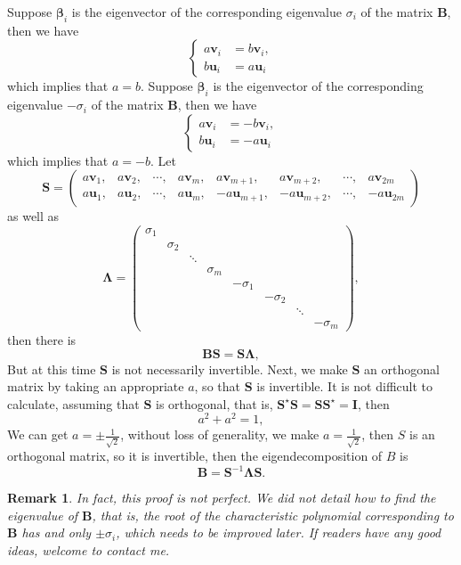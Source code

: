 \documentclass{article}
\newtheorem*{remark}{Remark}
\begin{document}
Suppose $\bm{\beta}_i$ is the eigenvector of the corresponding eigenvalue $\sigma_i$ of the matrix $\bm{B}$, then we have
$$
\begin{cases}
a\bm{v}_i &= b\bm{v}_i, \\
b \bm{u}_i &= a\bm{u}_i
\end{cases}
$$
which implies that $a = b$.
Suppose $\bm{\beta}_i$ is the eigenvector of the corresponding eigenvalue $-\sigma_i$ of the matrix $\bm{B}$, then we have
$$
\begin{cases}
a\bm{v}_i &= -b\bm{v}_i, \\
b \bm{u}_i &= -a\bm{u}_i
\end{cases}
$$
which implies that $a = -b$. Let
$$
\bm{S} = \begin{pmatrix}
a\bm{v}_1, &a\bm{v}_2, &\cdots, &a\bm{v}_m, &a\bm{v}_{m+1}, &a\bm{v}_{m+2}, &\cdots,&a\bm{v}_{2m} \\
a\bm{u}_1, &a\bm{u}_2, &\cdots,&a\bm{u}_m, &-a\bm{u}_{m+1}, &-a\bm{u}_{m+2}, &\cdots, &-a\bm{u}_{2m}
\end{pmatrix}
$$
as well as
$$
\bm{\Lambda} = 
 \begin{pmatrix}
   \sigma_{1} &  &  &&&&&\\ 
   & \sigma_{2} &  & &&&&\\ 
   &  &  \ddots & &&&&\\ 
   &  &   & \sigma_{m} &&&&\\
   &  &   & &-\sigma_{1} && &\\
   &  &   & & & -\sigma_{2}&& \\
   &  &   & & & & \ddots &\\
   &  &   & & & & & -\sigma_{m}
 \end{pmatrix},
$$
then there is
$$
\bm{B} \bm{S} = \bm{S} \bm{\Lambda},
$$
But at this time $\bm{S}$ is not necessarily invertible. Next, we make $\bm{S}$ an orthogonal matrix by taking an appropriate $a$, so that $\bm{S}$ is invertible. It is not difficult to calculate, assuming that $\bm{S}$ is orthogonal, that is, $\bm{S}^{\star} \bm{S} = \bm{S} \bm{S}^{\star} = \bm{I}$, then
$$
a^2 + a^2 = 1,
$$
We can get $a = \pm \frac{1}{\sqrt{2}}$, without loss of generality, we make $a = \frac{1}{\sqrt{2}}$, then $S $ is an orthogonal matrix, so it is invertible, then the eigendecomposition of $B$ is
$$
\bm{B} = \bm{S}^{-1} \bm{\Lambda} \bm{S}.
$$





\begin{remark}
In fact, this proof is not perfect. We did not detail how to find the eigenvalue of $\bm{B}$, that is, the root of the characteristic polynomial corresponding to $\bm{B}$ has and only $\pm \sigma_i$, which needs to be improved later. If readers have any good ideas, welcome to contact me.
\end{remark}
\end{document}
